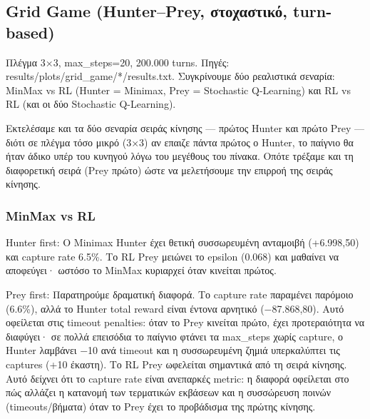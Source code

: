 \documentclass[11pt,a4paper]{article}
\newcommand{\eng}[1]{\foreignlanguage{english}{#1}}
\begin{document}
\subsection{Grid Game (Hunter–Prey, στοχαστικό, turn-based)}

Πλέγμα 3×3, max\_steps=20, 200.000 turns. Πηγές: \eng{results/plots/grid\_game/*/results.txt}. Συγκρίνουμε δύο ρεαλιστικά σεναρία: MinMax vs RL (Hunter = Minimax, Prey = Stochastic Q-Learning) και RL vs RL (και οι δύο Stochastic Q-Learning).

Εκτελέσαμε και τα δύο σεναρία σειράς κίνησης — πρώτος Hunter και πρώτο Prey — διότι σε πλέγμα τόσο μικρό (3×3) αν επαιζε πάντα πρώτος ο Hunter, το παίγνιο θα ήταν άδικο υπέρ του κυνηγού λόγω του μεγέθους του πίνακα. Οπότε τρέξαμε και τη διαφορετική σειρά (Prey πρώτο) ώστε να μελετήσουμε την επιρροή της σειράς κίνησης.

\subsubsection{MinMax vs RL}

\begin{center}
\end{center}

Hunter first: Ο Minimax Hunter έχει θετική συσσωρευμένη ανταμοιβή (+6.998,50) και capture rate 6.5\%. Το RL Prey μειώνει το epsilon (0.068) και μαθαίνει να αποφεύγει· ωστόσο το MinMax κυριαρχεί όταν κινείται πρώτος.

Prey first: Παρατηρούμε δραματική διαφορά. Το capture rate παραμένει παρόμοιο (6.6\%), αλλά το Hunter total reward είναι έντονα αρνητικό (−87.868,80). Αυτό οφείλεται στις timeout penalties: όταν το Prey κινείται πρώτο, έχει προτεραιότητα να διαφύγει· σε πολλά επεισόδια το παίγνιο φτάνει τα max\_steps χωρίς capture, ο Hunter λαμβάνει −10 ανά timeout και η συσσωρευμένη ζημιά υπερκαλύπτει τις captures (+10 έκαστη). Το RL Prey ωφελείται σημαντικά από τη σειρά κίνησης. Αυτό δείχνει ότι το capture rate είναι ανεπαρκές metric: η διαφορά οφείλεται στο πώς αλλάζει η κατανομή των τερματικών εκβάσεων και η συσσώρευση ποινών (timeouts/βήματα) όταν το Prey έχει το προβάδισμα της πρώτης κίνησης.
\end{document}
